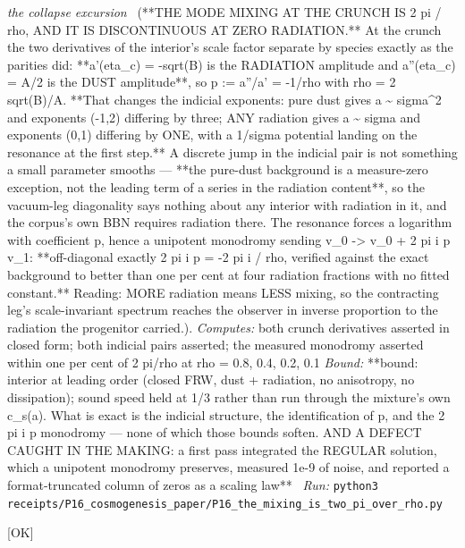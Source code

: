 \begin{description}
\textit{the collapse excursion} \ (**THE MODE MIXING AT THE CRUNCH IS 2 pi / rho, AND IT IS DISCONTINUOUS AT ZERO RADIATION.** At the crunch the two derivatives of the interior's scale factor separate by species exactly as the parities did: **a'(eta\_c) = -sqrt(B) is the RADIATION amplitude and a''(eta\_c) = A/2 is the DUST amplitude**, so p := a''/a' = -1/rho with rho = 2 sqrt(B)/A. **That changes the indicial exponents: pure dust gives a \textasciitilde{} sigma\textasciicircum{}2 and exponents (-1,2) differing by three; ANY radiation gives a \textasciitilde{} sigma and exponents (0,1) differing by ONE, with a 1/sigma potential landing on the resonance at the first step.** A discrete jump in the indicial pair is not something a small parameter smooths --- **the pure-dust background is a measure-zero exception, not the leading term of a series in the radiation content**, so the vacuum-leg diagonality says nothing about any interior with radiation in it, and the corpus's own BBN requires radiation there. The resonance forces a logarithm with coefficient p, hence a unipotent monodromy sending v\_0 -> v\_0 + 2 pi i p v\_1: **off-diagonal exactly 2 pi i p = -2 pi i / rho, verified against the exact background to better than one per cent at four radiation fractions with no fitted constant.** Reading: MORE radiation means LESS mixing, so the contracting leg's scale-invariant spectrum reaches the observer in inverse proportion to the radiation the progenitor carried.). 
\emph{Computes:} both crunch derivatives asserted in closed form; both indicial pairs asserted; the measured monodromy asserted within one per cent of 2 pi/rho at rho = 0.8, 0.4, 0.2, 0.1
 \emph{Bound:} **bound: interior at leading order (closed FRW, dust + radiation, no anisotropy, no dissipation); sound speed held at 1/3 rather than run through the mixture's own c\_s(a). What is exact is the indicial structure, the identification of p, and the 2 pi i p monodromy --- none of which those bounds soften. AND A DEFECT CAUGHT IN THE MAKING: a first pass integrated the REGULAR solution, which a unipotent monodromy preserves, measured 1e-9 of noise, and reported a format-truncated column of zeros as a scaling law**
\ \emph{Run:} \texttt{python3 receipts/P16\_cosmogenesis\_paper/P16\_the\_mixing\_is\_two\_pi\_over\_rho.py}
\item[\label{rcpt:P16_what_the_sky_permits}\texttt{P16\_what\_the\_sky\_permits}]\hfill\textsf{[OK]}\\

\end{description}
